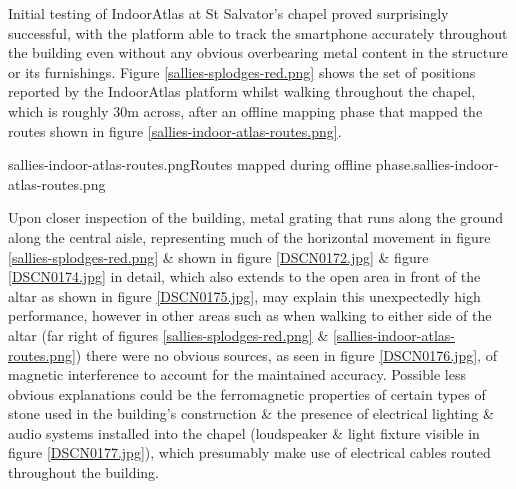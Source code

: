 Initial testing of IndoorAtlas at St Salvator's chapel proved surprisingly successful, with the platform able to track the smartphone accurately throughout the building even without any obvious overbearing metal content in the structure or its furnishings. Figure \ref{sallies-splodges-red.png} shows the set of positions reported by the IndoorAtlas platform whilst walking throughout the chapel, which is roughly 30m across, after an offline mapping phase that mapped the routes shown in figure \ref{sallies-indoor-atlas-routes.png}.

       {sallies-indoor-atlas-routes.png}{Routes mapped during offline phase.}{sallies-indoor-atlas-routes.png}

Upon closer inspection of the building, metal grating that runs along the ground along the central aisle, representing much of the horizontal movement in figure \ref{sallies-splodges-red.png} \& shown in figure \ref{DSCN0172.jpg} \& figure \ref{DSCN0174.jpg} in detail, which also extends to the open area in front of the altar as shown in figure \ref{DSCN0175.jpg}, may explain this unexpectedly high performance, however in other areas such as when walking to either side of the altar (far right of figures \ref{sallies-splodges-red.png} \& \ref{sallies-indoor-atlas-routes.png}) there were no obvious sources, as seen in figure \ref{DSCN0176.jpg}, of magnetic interference to account for the maintained accuracy. Possible less obvious explanations could be the ferromagnetic properties of certain types of stone used in the building's construction \& the presence of electrical lighting \& audio systems installed into the chapel (loudspeaker \& light fixture visible in figure \ref{DSCN0177.jpg}), which presumably make use of electrical cables routed throughout the building.


